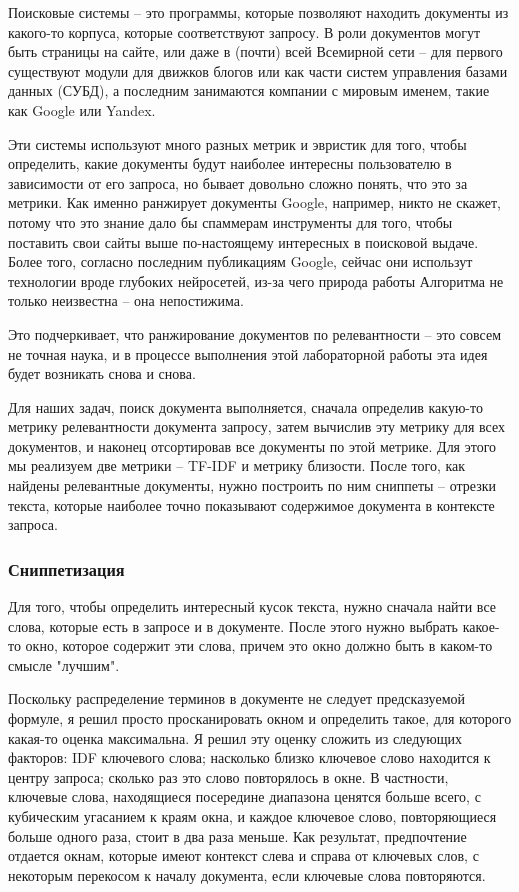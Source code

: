 \documentclass[a4page]{article}
\let\Oldsubsubsection\subsubsection
\renewcommand{\subsubsection}{\FloatBarrier\Oldsubsubsection}
\begin{document}
Поисковые системы -- это программы, которые позволяют находить документы из какого-то корпуса, которые соответствуют запросу. В роли документов могут быть страницы на сайте, или даже в (почти) всей Всемирной сети -- для первого существуют модули для движков блогов или как части систем управления базами данных (СУБД), а последним занимаются компании с мировым именем, такие как Google или Yandex. 

Эти системы используют много разных метрик и эвристик для того, чтобы определить, какие документы будут наиболее интересны пользователю в зависимости от его запроса, но бывает довольно сложно понять, что это за метрики. Как именно ранжирует документы Google, например, никто не скажет, потому что это знание дало бы спаммерам инструменты для того, чтобы поставить свои сайты выше по-настоящему интересных в поисковой выдаче. Более того, согласно последним публикациям Google, сейчас они использут технологии вроде глубоких нейросетей, из-за чего природа работы Алгоритма не только неизвестна -- она непостижима.

Это подчеркивает, что ранжирование документов по релевантности -- это совсем не точная наука, и в процессе выполнения этой лабораторной работы эта идея будет возникать снова и снова.

Для наших задач, поиск документа выполняется, сначала определив какую-то метрику релевантности документа запросу, затем вычислив эту метрику для всех документов, и наконец отсортировав все документы по этой метрике. Для этого мы реализуем две метрики -- TF-IDF и метрику близости. После того, как найдены релевантные документы, нужно построить по ним сниппеты -- отрезки текста, которые наиболее точно показывают содержимое документа в контексте запроса.

\subsubsection{Сниппетизация}

Для того, чтобы определить интересный кусок текста, нужно сначала найти все слова, которые есть в запросе и в документе. После этого нужно выбрать какое-то окно, которое содержит эти слова, причем это окно должно быть в каком-то смысле "лучшим".

Поскольку распределение терминов в документе не следует предсказуемой формуле, я решил просто просканировать окном и определить такое, для которого какая-то оценка максимальна. Я решил эту оценку сложить из следующих факторов: IDF ключевого слова; насколько близко ключевое слово находится к центру запроса; сколько раз это слово повторялось в окне. В частности, ключевые слова, находящиеся посередине диапазона ценятся больше всего, с кубическим угасанием к краям окна, и каждое ключевое слово, повторяющиеся больше одного раза, стоит в два раза меньше. Как результат, предпочтение отдается окнам, которые имеют контекст слева и справа от ключевых слов, с некоторым перекосом к началу документа, если ключевые слова повторяются.
\end{document}
